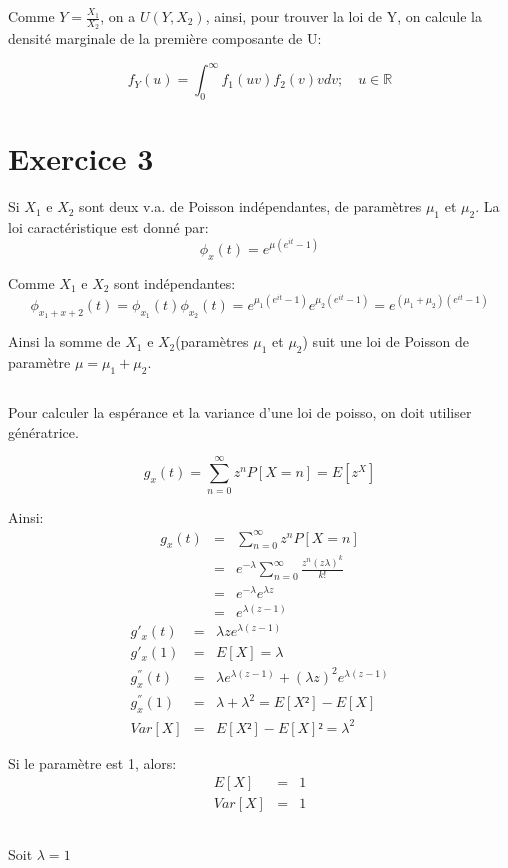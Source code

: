 \documentclass[a4paper]{article}
\begin{document}
Comme $Y=\frac{X_1}{X_2}$, on a $U(Y,X_2)$, ainsi,  pour trouver la loi de Y, on
calcule la densité marginale de la première composante de U:

\begin{equation}
f_Y(u)=\int_0^\infty f_1(uv)f_2(v)vdv ; \quad u \in \mathbb{R}
\end{equation}


\section{Exercice 3}

Si $X_1$ e $X_2$ sont deux  v.a. de Poisson indépendantes, de paramètres $\mu_1$
et $\mu_2$. La loi caractéristique est donné par:
\begin{equation}
  \phi_x(t)=e^{\mu(e^{it}-1)}
\end{equation}

Comme $X_1$ e $X_2$ sont indépendantes:
\begin{equation}
  \phi_{x_1+x+2}(t)=\phi_{x_1}(t)\phi_{x_2}(t)=e^{\mu_1(e^{it}-1)}e^{\mu_2(e^{it}-1)}=
  e^{(\mu_1+\mu_2)(e^{it}-1)}
\end{equation}

Ainsi la somme  de $X_1$ e $X_2$(paramètres $\mu_1$ et $\mu_2$)  suit une loi de
Poisson de paramètre $\mu=\mu_1+\mu_2$.

\subsection{}
Pour calculer la espérance et la  variance d'une loi de poisso, on doit utiliser
génératrice.

\begin{equation}
  g_x(t)=\sum_{n=0}^{\infty}z^nP[X=n]=E[z^X]
\end{equation}

Ainsi:
\begin{eqnarray*}
  g_x(t)&=& \sum_{n=0}^{\infty}z^nP[X=n]\\
  &=& e^{-\lambda}\sum_{n=0}^{\infty}\frac{z^n(z\lambda)^k}{k!}\\
  &=& e^{-\lambda}e^{\lambda z}\\
  &=& e^{\lambda(z-1)}
\end{eqnarray*}
\begin{eqnarray*}
  g'_x(t)&=& \lambda ze^{\lambda(z-1)}\\
  g'_x(1)&=&E[X]= \lambda\\
  g^{''}_x(t)&=& \lambda e^{\lambda(z-1)}+(\lambda z)^2e^{\lambda(z-1)}\\
  g^{''}_x(1)&=& \lambda + \lambda^2 = E[X²]-E[X]\\
  Var[X] &=& E[X²]-E[X]² = \lambda^2
\end{eqnarray*}

Si le paramètre est 1, alors:
\begin{eqnarray*}
  E[X]&=& 1\\
  Var[X] &=& 1
\end{eqnarray*}

\subsection{}
Soit $\lambda =1$
\subsection{}
\end{document}

